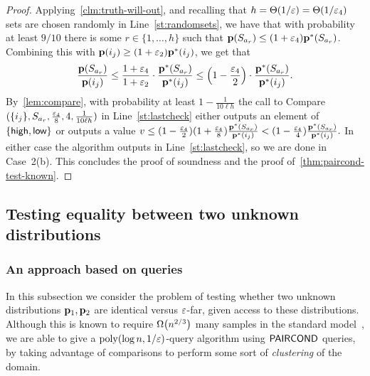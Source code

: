 \begin{proof}
Applying~\cref{clm:truth-will-out}, and recalling that
{$h=\Theta(1/\varepsilon) = \Theta(1/{\varepsilon_4})$} sets are chosen
randomly in Line~\ref{st:randomsets}, we have that with probability at
least $9/10$ there is some $r \in \{1,\dots,h\}$ such that
\mbox{$\mathbf{p}(S_{a_r}) \leq (1+{\varepsilon_4})\mathbf{p}^\ast(S_{a_r})$}.
Combining this with $\mathbf{p}(i_j) \geq (1+{\varepsilon_2})\mathbf{p}^\ast(i_j)$, we get that
\[
{\frac {\D(S_{a_r})}{\D(i_j)}} \leq
{\frac {1 + {\eps_4}}{1 + {\eps_2}}} \cdot
{\frac {\D^\ast(S_{a_r})}{\D^\ast(i_j)}}
\leq \left(1 -  {\frac{\eps_4}{2}}\right) \cdot
{\frac {\D^\ast(S_{a_r})}{\D^\ast(i_j)}}.
\]
By~\cref{lem:compare}, with probability at least
$1 - {\frac{1}{10\ell h}}$ the call to
{\sc Compare}$(\{i_j\},S_{a_r},\frac{\varepsilon_4}{8},
4, {\frac{1}{10 \ell h}})$ in Line~\ref{st:lastcheck}
either outputs an element of $\{{\textsf{high}},{\textsf{low}}\}$ or outputs a value
$v \leq (1 - {\frac{\varepsilon_4}{2}}) (1 + \frac{\varepsilon_4}{8})
{\frac {\mathbf{p}^\ast(S_{a_r})}{\mathbf{p}^\ast(i_j)}}
<
(1 - {\frac {\varepsilon_4}{4}})
{\frac {\mathbf{p}^\ast(S_{a_r})}{\mathbf{p}^\ast(i_j)}}.
$
In either case the algorithm outputs \reject in
Line~\ref{st:lastcheck}, so we are done in Case~2(b).
This concludes the proof of soundness and the proof of~\cref{thm:paircond-test-known}.
\end{proof}

\subsection{Testing equality between two unknown distributions}
\label{sec:d1d2}
\subsubsection{An approach based on \PCOND queries}

In this subsection we consider the problem of testing whether two unknown
distributions $\mathbf{p}_1,\mathbf{p}_2$ are identical versus $\varepsilon$-far, given
\PCOND
access to these distributions. Although this is known to require
$\bigOmega{n^{2/3}}$ many samples in the standard
model~\cite{BFRSW:10,Valiant:11}, we are able to give
a $\operatorname*{poly}(\log n, 1/\varepsilon)$-query algorithm using
${\sf PAIRCOND}$ queries,
by taking advantage of comparisons to perform some
sort of \emph{clustering} of the domain.


